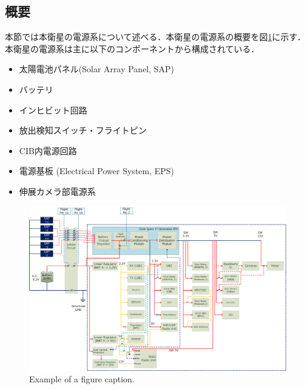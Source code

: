 \subsection{概要}
本節では本衛星の電源系について述べる．本衛星の電源系の概要を図\ref{3_1_power_diagram}に示す．本衛星の電源系は主に以下のコンポーネントから構成されている．
\begin{itemize}
	\item 太陽電池パネル(Solar Array Panel, SAP)
	\item バッテリ
	\item インヒビット回路
	\item 放出検知スイッチ・フライトピン
	\item CIB内電源回路
	\item 電源基板 (Electrical Power System, EPS)
	\item 伸展カメラ部電源系
\end{itemize}


\begin{landscape}
	\begin{figure}[htbp]
		\centering
		\includegraphics[width=0.8\linewidth]{./03/fig/Power_diagram.png}
		\caption{Example of a figure caption.}
		\label{3_1_power_diagram}
	\end{figure}
\end{landscape}    
